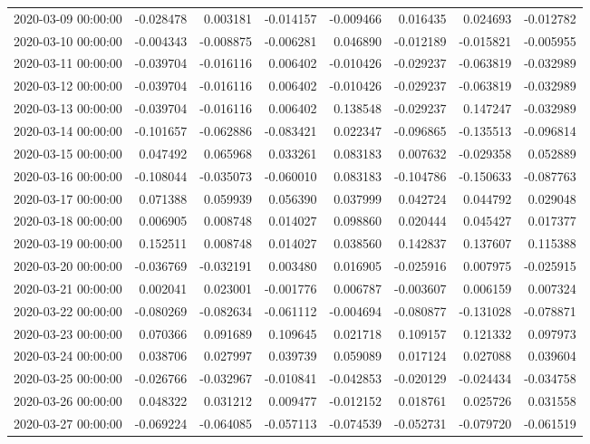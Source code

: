 \begin{tabular}{lrrrrrrr}
2020-03-09 00:00:00 & -0.028478 & 0.003181 & -0.014157 & -0.009466 & 0.016435 & 0.024693 & -0.012782 \\
2020-03-10 00:00:00 & -0.004343 & -0.008875 & -0.006281 & 0.046890 & -0.012189 & -0.015821 & -0.005955 \\
2020-03-11 00:00:00 & -0.039704 & -0.016116 & 0.006402 & -0.010426 & -0.029237 & -0.063819 & -0.032989 \\
2020-03-12 00:00:00 & -0.039704 & -0.016116 & 0.006402 & -0.010426 & -0.029237 & -0.063819 & -0.032989 \\
2020-03-13 00:00:00 & -0.039704 & -0.016116 & 0.006402 & 0.138548 & -0.029237 & 0.147247 & -0.032989 \\
2020-03-14 00:00:00 & -0.101657 & -0.062886 & -0.083421 & 0.022347 & -0.096865 & -0.135513 & -0.096814 \\
2020-03-15 00:00:00 & 0.047492 & 0.065968 & 0.033261 & 0.083183 & 0.007632 & -0.029358 & 0.052889 \\
2020-03-16 00:00:00 & -0.108044 & -0.035073 & -0.060010 & 0.083183 & -0.104786 & -0.150633 & -0.087763 \\
2020-03-17 00:00:00 & 0.071388 & 0.059939 & 0.056390 & 0.037999 & 0.042724 & 0.044792 & 0.029048 \\
2020-03-18 00:00:00 & 0.006905 & 0.008748 & 0.014027 & 0.098860 & 0.020444 & 0.045427 & 0.017377 \\
2020-03-19 00:00:00 & 0.152511 & 0.008748 & 0.014027 & 0.038560 & 0.142837 & 0.137607 & 0.115388 \\
2020-03-20 00:00:00 & -0.036769 & -0.032191 & 0.003480 & 0.016905 & -0.025916 & 0.007975 & -0.025915 \\
2020-03-21 00:00:00 & 0.002041 & 0.023001 & -0.001776 & 0.006787 & -0.003607 & 0.006159 & 0.007324 \\
2020-03-22 00:00:00 & -0.080269 & -0.082634 & -0.061112 & -0.004694 & -0.080877 & -0.131028 & -0.078871 \\
2020-03-23 00:00:00 & 0.070366 & 0.091689 & 0.109645 & 0.021718 & 0.109157 & 0.121332 & 0.097973 \\
2020-03-24 00:00:00 & 0.038706 & 0.027997 & 0.039739 & 0.059089 & 0.017124 & 0.027088 & 0.039604 \\
2020-03-25 00:00:00 & -0.026766 & -0.032967 & -0.010841 & -0.042853 & -0.020129 & -0.024434 & -0.034758 \\
2020-03-26 00:00:00 & 0.048322 & 0.031212 & 0.009477 & -0.012152 & 0.018761 & 0.025726 & 0.031558 \\
2020-03-27 00:00:00 & -0.069224 & -0.064085 & -0.057113 & -0.074539 & -0.052731 & -0.079720 & -0.061519 \\

\end{tabular}
